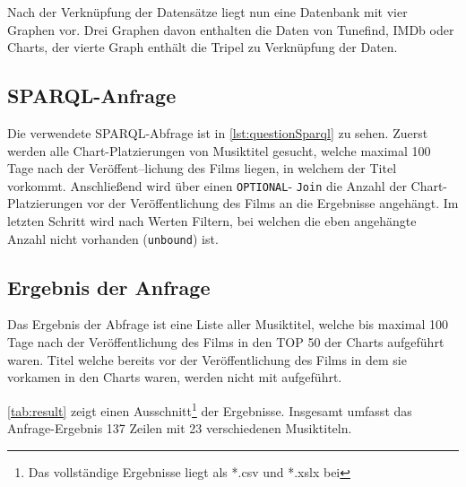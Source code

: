 \documentclass[parskip]{scrartcl}
\begin{document}
Nach der Verknüpfung der Datensätze liegt nun eine Datenbank mit vier Graphen vor. Drei Graphen davon enthalten die Daten von Tunefind, IMDb oder Charts, der vierte Graph enthält die Tripel zu Verknüpfung der Daten.

\subsection{SPARQL-Anfrage}

Die verwendete SPARQL-Abfrage ist in \autoref{lst:questionSparql} zu sehen. Zuerst werden alle Chart-Platzierungen von Musiktitel gesucht, welche maximal 100 Tage nach der Veröffent--lichung des Films liegen, in welchem der Titel vorkommt. Anschließend wird über einen \texttt{OPTIONAL}- \texttt{Join} die Anzahl der Chart-Platzierungen vor der Veröffentlichung des Films an die Ergebnisse angehängt. Im letzten Schritt wird nach Werten Filtern, bei welchen die eben angehängte Anzahl nicht vorhanden (\texttt{unbound}) ist.

\subsection{Ergebnis der Anfrage} 

Das Ergebnis der Abfrage ist eine Liste aller Musiktitel, welche bis maximal 100 Tage nach der Veröffentlichung des Films in den TOP 50 der Charts aufgeführt waren. Titel welche bereits vor der Veröffentlichung des Films in dem sie vorkamen in den Charts waren, werden nicht mit aufgeführt.

\autoref{tab:result} zeigt einen Ausschnitt\footnote{Das vollständige Ergebnisse liegt als *.csv und *.xslx bei} der Ergebnisse. Insgesamt umfasst das Anfrage-Ergebnis 137 Zeilen mit 23 verschiedenen Musiktiteln.
\end{document}
